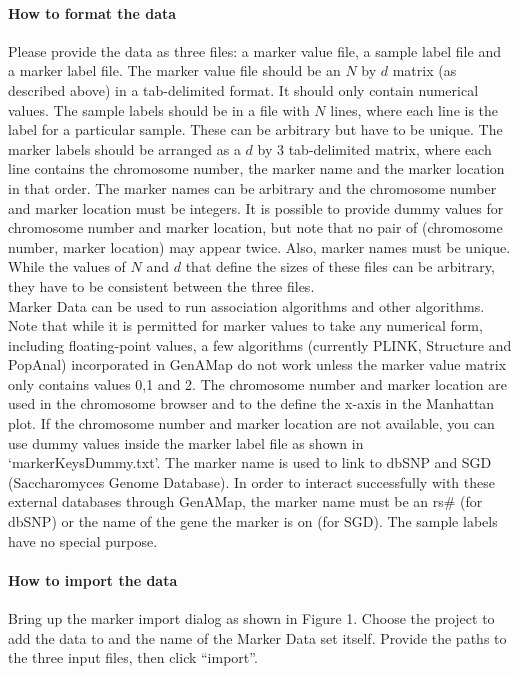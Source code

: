 \documentclass{article}
\begin{document}
\paragraph{How to format the data} Please provide the data as three files: a marker value file, a sample label file and a marker label file. The marker value file should be an $N$ by $d$ matrix (as described above) in a tab-delimited format. It should only contain numerical values. The sample labels should be in a file with $N$ lines, where each line is the label for a particular sample. These can be arbitrary but have to be unique. The marker labels should be arranged as a $d$ by 3 tab-delimited matrix, where each line contains the chromosome number, the marker name and the marker location in that order. The marker names can be arbitrary and the chromosome number and marker location must be integers. It is possible to provide dummy values for chromosome number and marker location, but note that no pair of (chromosome number, marker location) may appear twice. Also, marker names must be unique. While the values of $N$ and $d$ that define the sizes of these files can be arbitrary, they have to be consistent between the three files.\\

Marker Data can be used to run association algorithms and other algorithms. Note that while it is permitted for marker values to take any numerical form, including floating-point values, a few algorithms (currently PLINK, Structure and PopAnal) incorporated in GenAMap do not work unless the marker value matrix only contains values 0,1 and 2. The chromosome number and marker location are used in the chromosome browser and to the define the x-axis in the Manhattan plot. If the chromosome number and marker location are not available, you can use dummy values inside the marker label file as shown in `markerKeysDummy.txt'. The marker name is used to link to dbSNP and SGD (Saccharomyces Genome Database). In order to interact successfully with these external databases through GenAMap, the marker name must be an rs\# (for dbSNP) or the name of the gene the marker is on (for SGD). The sample labels have no special purpose.

\paragraph{How to import the data} Bring up the marker import dialog as shown in Figure 1. Choose the project to add the data to and the name of the Marker Data set itself. Provide the paths to the three input files, then click ``import''.
\end{document}
